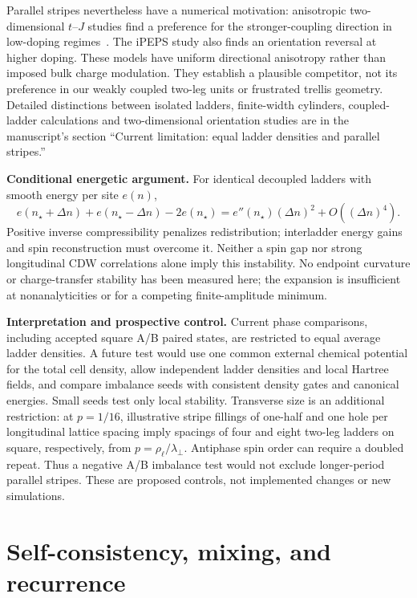 \documentclass[11pt]{article}
\begin{document}
Parallel stripes nevertheless have a numerical motivation: anisotropic
two-dimensional \(t\)--\(J\) studies find a preference for the stronger-coupling
direction in low-doping regimes~\cite{kampf2001,corboz2014}. The iPEPS study
also finds an orientation reversal at higher doping. These models have
uniform directional anisotropy rather than imposed bulk charge modulation.
They establish a plausible competitor, not its preference in our weakly
coupled two-leg units or frustrated trellis geometry. Detailed distinctions
between isolated ladders, finite-width cylinders, coupled-ladder calculations
and two-dimensional orientation studies are in the manuscript's section
``Current limitation: equal ladder densities and parallel stripes.''

\textbf{Conditional energetic argument.}
For identical decoupled ladders with smooth energy per site \(e(n)\),
\begin{equation}
 e(n_\star+\Delta n)+e(n_\star-\Delta n)-2e(n_\star)
 =e''(n_\star)(\Delta n)^2+O((\Delta n)^4).
\end{equation}
Positive inverse compressibility penalizes redistribution; interladder
energy gains and spin reconstruction must overcome it. Neither a spin gap
nor strong longitudinal CDW correlations alone imply this instability.
No endpoint curvature or charge-transfer stability has been measured here;
the expansion is insufficient at nonanalyticities or for a competing
finite-amplitude minimum.

\textbf{Interpretation and prospective control.}
Current phase comparisons, including accepted square A/B paired states,
are restricted to equal average ladder densities. A future test would use
one common external chemical potential for the total cell density, allow
independent ladder densities and local Hartree fields, and compare
imbalance seeds with consistent density gates and canonical energies.
Small seeds test only local stability. Transverse size is an additional
restriction: at \(p=1/16\), illustrative stripe fillings of one-half and
one hole per longitudinal lattice spacing imply spacings of four and eight
two-leg ladders on square, respectively, from \(p=\rho_\ell/\lambda_\perp\).
Antiphase spin order can require a doubled repeat. Thus a negative A/B
imbalance test would not exclude longer-period parallel stripes.
These are proposed controls, not implemented changes or new simulations.

\section{Self-consistency, mixing, and recurrence}
\label{sec:scf}
\end{document}
